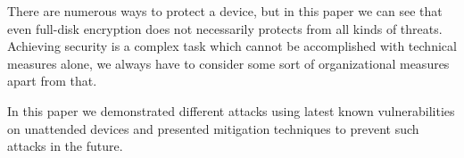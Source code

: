 There are numerous ways to protect a device, but in this paper we can see that even full-disk encryption does not necessarily protects from all kinds of threats. Achieving security is a complex task which cannot be accomplished with technical measures alone, we always have to consider some sort of organizational measures apart from that.

In this paper we demonstrated different attacks using latest known vulnerabilities on unattended devices and presented mitigation techniques to prevent such attacks in the future. 

